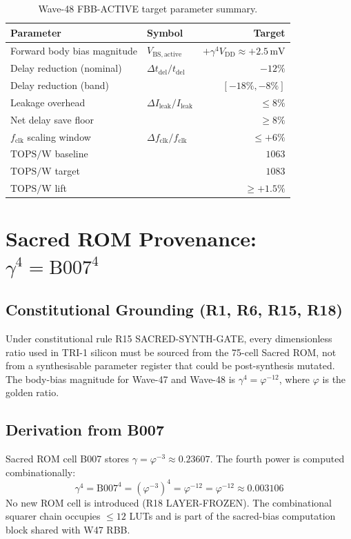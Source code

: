\documentclass[12pt,a4paper]{report}
\theoremstyle{plain}
\theoremstyle{definition}
\theoremstyle{remark}
\newcommand{\vbs}{V_{\mathrm{BS,active}}}
\newcommand{\vdd}{V_{\mathrm{DD}}}
\newcommand{\gammaFour}{\gamma^{4}}
\newcommand{\phiInvTwelve}{\varphi^{-12}}
\newcommand{\topsw}{\mathrm{TOPS/W}}
\newcommand{\fclk}{f_{\mathrm{clk}}}
\newcommand{\tdel}{t_{\mathrm{del}}}
\begin{document}
\begin{table}[h!]
\centering
\caption{Wave-48 FBB-ACTIVE target parameter summary.}
\label{tab:targets}
\begin{tabular}{llr}
\toprule
Parameter & Symbol & Target \\
\midrule
Forward body bias magnitude & $\vbs$ & $+\gammaFour \vdd \approx +2.5\,\mathrm{mV}$ \\
Delay reduction (nominal) & $\Delta \tdel / \tdel$ & $-12\%$ \\
Delay reduction (band) & & $[-18\%,-8\%]$ \\
Leakage overhead & $\Delta I_{\mathrm{leak}} / I_{\mathrm{leak}}$ & $\leq 8\%$ \\
Net delay save floor & & $\geq 8\%$ \\
$\fclk$ scaling window & $\Delta \fclk / \fclk$ & $\leq +6\%$ \\
$\topsw$ baseline & & $1063$ \\
$\topsw$ target & & $1083$ \\
$\topsw$ lift & & $\geq +1.5\%$ \\
\bottomrule
\end{tabular}
\end{table}

\section{Sacred ROM Provenance: $\gammaFour = \mathrm{B007}^{4}$}
\label{sec:sacred_rom}

\subsection{Constitutional Grounding (R1, R6, R15, R18)}

Under constitutional rule R15 SACRED-SYNTH-GATE, every dimensionless ratio used in TRI-1
silicon must be sourced from the 75-cell Sacred ROM, not from a synthesisable parameter register
that could be post-synthesis mutated.  The body-bias magnitude for Wave-47 and Wave-48 is
$\gammaFour = \phiInvTwelve$, where $\varphi$ is the golden ratio.

\subsection{Derivation from B007}

Sacred ROM cell B007 stores $\gamma = \varphi^{-3} \approx 0.23607$.  The fourth power is
computed combinationally:
\begin{equation}
  \gammaFour = \mathrm{B007}^{4} = (\varphi^{-3})^{4} = \varphi^{-12} = \phiInvTwelve
  \approx 0.003106
\end{equation}
No new ROM cell is introduced (R18 LAYER-FROZEN).  The combinational squarer chain occupies
$\leq 12$ LUTs and is part of the sacred-bias computation block shared with W47 RBB.
\end{document}
